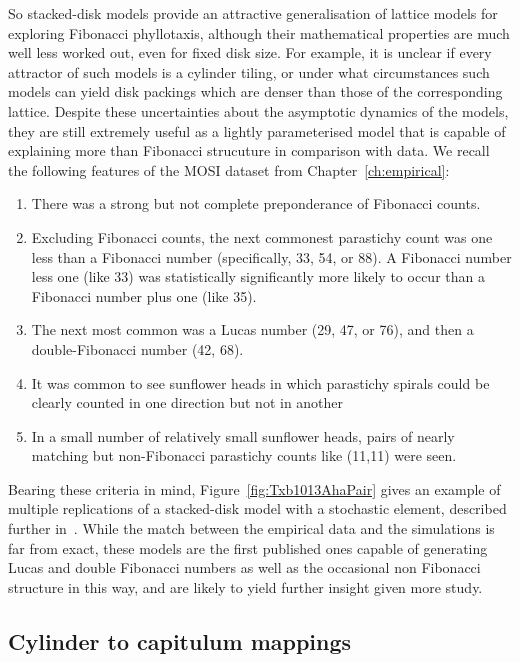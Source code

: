 So stacked-disk models provide an attractive generalisation of lattice models for exploring Fibonacci phyllotaxis, although their mathematical properties are much well less worked out, even for fixed disk size.  For example,  it is unclear if every attractor of such models is a cylinder tiling, or under what circumstances
such models can yield disk packings which are denser than those of the corresponding lattice. Despite these uncertainties about the asymptotic dynamics of the models, they are still extremely useful as a lightly parameterised model that is capable of explaining more than Fibonacci strucuture in comparison with data.
We recall the following features of the MOSI dataset from Chapter~\ref{ch:empirical}:

\begin{enumerate}
	\item There was a strong but not complete preponderance of Fibonacci counts.
	\item	Excluding Fibonacci counts, the next commonest parastichy count was one less than a Fibonacci number (specifically, 33, 54, or 88).  A Fibonacci number less one (like 33) was statistically significantly more likely to occur than a Fibonacci number plus one (like 35).
	\item The next most common was a Lucas number (29, 47, or 76), and then a double-Fibonacci number (42, 68).
	\item It was common to see sunflower heads in which parastichy spirals could be clearly counted in one direction but not in another
	\item In a small number of relatively small sunflower heads, pairs of nearly matching but non-Fibonacci parastichy counts like (11,11)  were seen.
\end{enumerate}

Bearing these criteria in mind, Figure~\ref{fig:Txb1013AhaPair} gives an example of multiple replications of a stacked-disk model with a stochastic element, described further in~\cite{swintonDiskstackingModelsAre2024}. While the match between the empirical data and the simulations is far from exact, these models are the first published ones capable of generating Lucas and double Fibonacci numbers as well as the occasional non Fibonacci structure in this way, and are likely to yield further insight given more study. 



\subsection{Cylinder to capitulum mappings}

